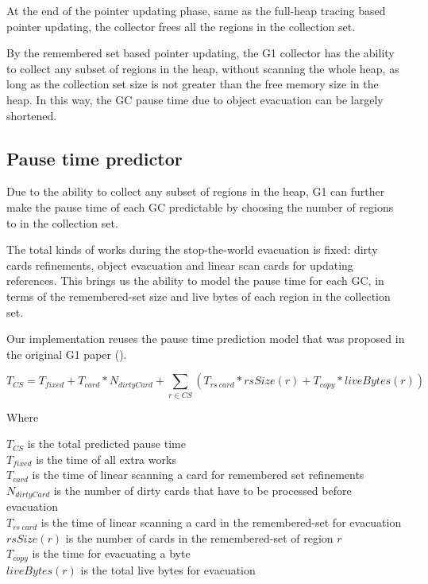 At the end of the pointer updating phase, same as the full-heap tracing based
pointer updating, the collector frees all the regions in the collection set.

By the remembered set based pointer updating, the G1 collector has the ability to collect
any subset of regions in the heap, without scanning the whole heap, as long as the collection set size is not greater
than the free memory size in the heap. In this way, the GC pause time due to object evacuation
can be largely shortened.

\subsection{Pause time predictor}

Due to the ability to collect any subset of regions in the heap, G1 can further
make the pause time of each GC predictable by choosing the number of regions to in the collection set.

The total kinds of works during the stop-the-world evacuation is fixed:
dirty cards refinements, object evacuation and linear scan cards for updating references.
This brings us the ability to model the pause time for each GC, in terms of the remembered-set
size and live bytes of each region in the collection set.

Our implementation reuses the pause time prediction model that was proposed in the
original G1 paper (\cite{detlefs2004garbage}).

$$
T_{CS} = T_{fixed} + T_{card} * N_{dirtyCard} + \sum_{r\in CS} (T_{rs\ card} * rsSize(r) + T_{copy} * liveBytes(r))
$$

\noindent Where

\noindent$T_{CS}$ is the total predicted pause time\\
$T_{fixed}$ is the time of all extra works\\
$T_{card}$ is the time of linear scanning a card for remembered set refinements\\
$N_{dirtyCard}$ is the number of dirty cards that have to be processed before evacuation\\
$T_{rs\ card}$ is the time of linear scanning a card in the remembered-set for evacuation\\
$rsSize(r)$ is the number of cards in the remembered-set of region $r$\\
$T_{copy}$ is the time for evacuating a byte\\
$liveBytes(r)$ is the total live bytes for evacuation\\

